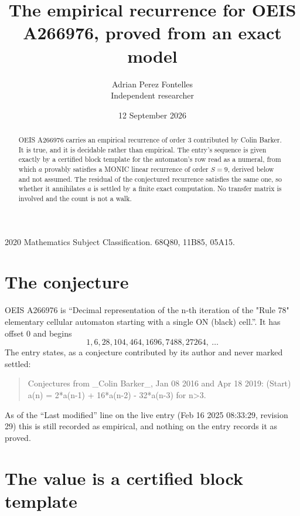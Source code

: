 \documentclass[11pt,a4paper]{article}
\title{The empirical recurrence for OEIS A266976, proved from an exact model}
\author{Adrian Perez Fontelles\\ \small Independent researcher}
\date{12 September 2026}
\theoremstyle{plain}
\theoremstyle{definition}
\begin{document}
\maketitle

\begin{abstract}
OEIS A266976 carries an empirical recurrence of order $3$ contributed by Colin Barker. It is true, and it is
decidable rather than empirical. The entry's sequence is given exactly by a certified block template for the automaton's row read as a numeral, from
which $a$ provably satisfies a MONIC linear recurrence of order $S=9$, derived below and not
assumed. The residual of the conjectured recurrence satisfies the same one, so whether it
annihilates $a$ is settled by a finite exact computation. No transfer matrix is involved and
the count is not a walk.
\end{abstract}

\noindent\small 2020 Mathematics Subject Classification. 68Q80, 11B85, 05A15.\normalsize

\section{The conjecture}

OEIS A266976 is ``Decimal representation of the n-th iteration of the "Rule 78" elementary cellular automaton starting with a single ON (black) cell.''. It has offset $0$ and begins
\[
1, 6, 28, 104, 464, 1696, 7488, 27264,\ \dots
\]
The entry states, as a conjecture contributed by its author and never marked settled:
\begin{quote}
Conjectures from \_Colin Barker\_, Jan 08 2016 and Apr 18 2019: (Start) a(n) = 2*a(n-1) + 16*a(n-2) - 32*a(n-3) for n>3.
\end{quote}
As of the ``Last modified'' line on the live entry (Feb 16 2025 08:33:29, revision 29)
this is still recorded as empirical, and nothing on the entry records it as proved.

\section{The value is a certified block template}
\end{document}
